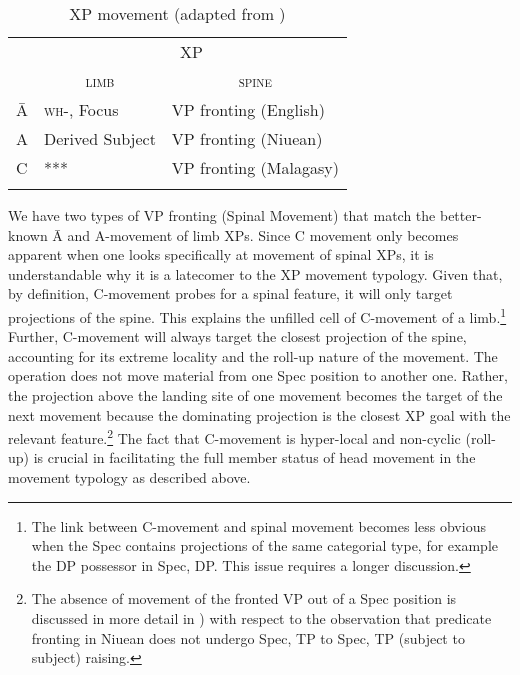 \documentclass[output=paper,colorlinks,citecolor=brown,
]{langscibook}
\begin{document}
\begin{table}
\caption{XP movement (adapted from \citet{Travis:2021})}
\begin{tabular}{ l  l  l }
\lsptoprule
& \multicolumn{2}{c}{XP} \\\cmidrule(lr){2-3}
&\multicolumn{1}{c}{\textsc{limb}} & \multicolumn{1}{c}{\textsc{spine}}   \\\midrule
\=A &  \textsc{wh-}, Focus & VP fronting (English)   \\
A  & Derived Subject&  VP fronting (Niuean)    \\
C  & ***  &  VP fronting (Malagasy) \\
\lspbottomrule
\end{tabular}
\end{table}

We have two types of VP fronting (Spinal Movement) that match the better-known \=A and A-movement of limb XPs.  Since C movement only becomes apparent when one looks specifically at movement of spinal XPs, it is understandable why it is a latecomer to the XP movement typology.  Given that, by definition, C-movement probes for a spinal feature, it will only target projections of the spine.  This explains the unfilled cell of C-movement of a limb.\footnote{The link between C-movement and spinal movement becomes less obvious when the Spec contains projections of the same categorial type, for example the DP possessor in Spec, DP. This issue requires a longer discussion.}    Further, C-movement will always target the closest projection of the spine, accounting for its extreme locality and the roll-up nature of the movement. The operation does not move material from one Spec position to another one. Rather, the projection above the landing site of one movement becomes the target of the next movement because the dominating projection is the closest XP goal with the relevant feature.\footnote{The absence of movement of the fronted VP out of a Spec position is discussed in more detail in \citet{Travis:2021}) with respect to the observation that predicate fronting in Niuean does not undergo Spec, TP to Spec, TP (subject to subject) raising.}   The fact that C-movement is hyper-local and non-cyclic (roll-up) is crucial in facilitating the full member status of head movement in the movement typology as described above.  
\end{document}

